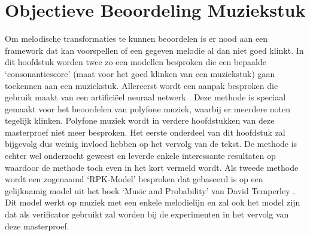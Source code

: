 \chapter{Objectieve Beoordeling Muziekstuk}
\label{hoofdstuk:OBM}
Om melodische transformaties te kunnen beoordelen is er nood aan een framework dat kan voorspellen of een gegeven melodie al dan niet goed klinkt. In dit hoofdstuk worden twee zo een modellen besproken die een bepaalde `consonantiescore' (maat voor het goed klinken van een muziekstuk) gaan toekennen aan een muziekstuk. Allereerst wordt een aanpak besproken die gebruik maakt van een artifici\"eel neuraal netwerk \cite{book:ANN}. Deze methode is speciaal gemaakt voor het beoordelen van polyfone muziek, waarbij er meerdere noten tegelijk klinken. Polyfone muziek wordt in verdere hoofdstukken van deze masterproef niet meer besproken. Het eerste onderdeel van dit hoofdstuk zal bijgevolg dus weinig invloed hebben op het vervolg van de tekst. De methode is echter wel onderzocht geweest en leverde enkele interessante resultaten op waardoor de methode toch even in het kort vermeld wordt. Als tweede methode wordt een zogenaamd `RPK-Model' besproken dat gebaseerd is op een gelijknamig model uit het boek `Music and Probability' \cite{book:musicAndProbability} van David Temperley \cite{url:temperley}. Dit model werkt op muziek met een enkele melodielijn en zal ook het model zijn dat als verificator gebruikt zal worden bij de experimenten in het vervolg van deze masterproef.

